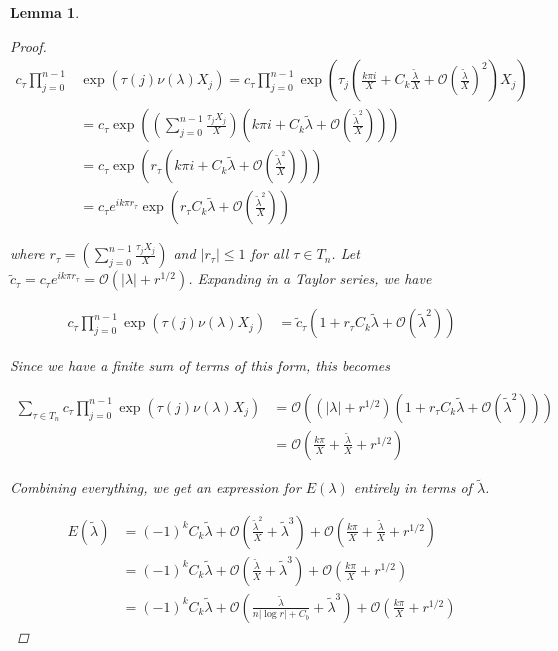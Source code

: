 \documentclass[12pt]{article}
\newtheorem{lemma}{Lemma}
\begin{document}
\begin{lemma}
\begin{proof}
\begin{align*}
c_\tau \prod_{j = 0}^{n-1} &\exp\left( {\tau(j) \nu(\lambda)X_j} \right)
= c_\tau \prod_{j = 0}^{n-1} 
\exp\left( \tau_j \left( \frac{k \pi i}{X} + C_k \frac{\tilde{\lambda}}{X} + \mathcal{O}\left( \frac{\tilde{\lambda}}{X}\right)^2 \right) X_j\right) \\
&= c_\tau \exp\left( \left( \sum_{j=0}^{n-1} \frac{\tau_j X_j}{X} \right)
\left( k \pi i + C_k \tilde{\lambda} + \mathcal{O}\left( \frac{\tilde{\lambda}^2}{X} \right) \right) \right) \\
&= c_\tau \exp\left( r_\tau
\left( k \pi i + C_k \tilde{\lambda} + \mathcal{O}\left( \frac{\tilde{\lambda}^2}{X} \right) \right) \right) \\ 
&= c_\tau e^{i k \pi r_\tau} \exp \left( r_\tau C_k \tilde{\lambda} + \mathcal{O}\left( \frac{\tilde{\lambda}^2}{X} \right) \right)
\end{align*}

where $r_\tau = \left( \sum_{j=0}^{n-1} \frac{\tau_j X_j}{X} \right)$ and $|r_\tau| \leq 1$ for all $\tau \in T_n$. Let $\tilde{c}_\tau = c_\tau e^{i k \pi r_\tau} = \mathcal{O}(|\lambda| + r^{1/2})$. Expanding in a Taylor series, we have

\begin{align*}
c_\tau \prod_{j = 0}^{n-1} \exp\left( {\tau(j) \nu(\lambda)X_j} \right)
&= \tilde{c}_\tau \left( 1 + r_\tau C_k \tilde{\lambda} + \mathcal{O}\left(\tilde{\lambda}^2 \right) \right) 
\end{align*}

Since we have a finite sum of terms of this form, this becomes

\begin{align*}
\sum_{\tau \in T_n} c_\tau \prod_{j = 0}^{n-1} \exp\left( {\tau(j) \nu(\lambda)X_j} \right)
&= \mathcal{O}\left( (|\lambda| + r^{1/2}) \left( 1 + r_\tau C_k \tilde{\lambda} + \mathcal{O}\left(\tilde{\lambda}^2 \right) \right)\right) \\
&= \mathcal{O} \left( \frac{k \pi}{X} + \frac{\tilde{\lambda}}{X} + r^{1/2} \right)
\end{align*}

Combining everything, we get an expression for $E(\lambda)$ entirely in terms of $\tilde{\lambda}$.

\begin{align*}
E(\tilde{\lambda})
&= (-1)^k C_k \tilde{\lambda} + \mathcal{O}\left( \frac{\tilde{\lambda}^2}{X} + \tilde{\lambda}^3 \right) + \mathcal{O} \left( \frac{k \pi}{X} + \frac{\tilde{\lambda}}{X} + r^{1/2} \right) \\
&= (-1)^k C_k \tilde{\lambda} + \mathcal{O}\left( \frac{\tilde{\lambda}}{X} + \tilde{\lambda}^3 \right) + \mathcal{O} \left( \frac{k \pi}{X} + r^{1/2} \right) \\
&= (-1)^k C_k \tilde{\lambda} + \mathcal{O}\left( \frac{\tilde{\lambda}}{n|\log r| + C_b} + \tilde{\lambda}^3 \right) + \mathcal{O} \left( \frac{k \pi}{X} + r^{1/2} \right)
\end{align*}


\end{proof}
\end{lemma}
\end{document}
